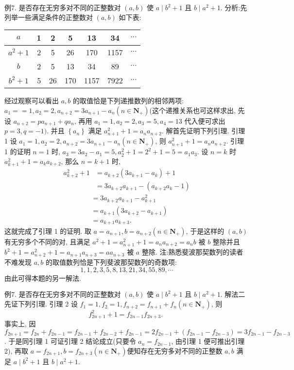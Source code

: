 例7. 是否存在无穷多对不同的正整数对 $(a, b)$ 使 $a \mid b^2+1$ 且 $b \mid a^2+1$.
分析:先列举一些满足条件的正整数对 $(a, b)$ 如下表:
\begin{tabular}{|c|c|c|c|c|c|c|}
\hline$a$ & 1 & 2 & 5 & 13 & 34 & $\cdots$ \\
\hline$a^2+1$ & 2 & 5 & 26 & 170 & 1157 & $\cdots$ \\
\hline$b$ & 2 & 5 & 13 & 34 & 89 & $\cdots$ \\
\hline$b^2+1$ & 5 & 26 & 170 & 1157 & 7922 & $\cdots$ \\
\hline
\end{tabular}
经过观察可以看出 $a, b$ 的取值恰是下列递推数列的相邻两项: $a_1==1, a_2= 2, a_{n+2}=3 a_{n+1}-a_n\left(n \in \mathbf{N}_{+}\right)$(这个递推关系也可这样求出, 先设 $a_{n+2}= p a_{n+1}+q a_n$, 再用 $a_1=1, a_2=2, a_3=5, a_4=13$ 代入便可求出 $p=3, q= -1)$. 并且 $\left\{a_n\right\}$ 满足 $a_{n+1}^2+1=a_n a_{n+2}$.
解首先证明下列引理.
引理 1 设 $a_1=1, a_2=2, a_{n+2}=3 a_{n+1}-a_n\left(n \in \mathbf{N}_{+}\right)$, 则 $a_{n+1}^2+1=a_n a_{n+2}$.
引理 1 的证明 $n=1$ 时, $a_3=3 a_2-a_1=5, a_2^2+1=2^2+1=5=a_1 a_3$.
设 $n=k$ 时 $a_{k+1}^2+1=a_k a_{k+2}$, 那么 $n=k+1$ 时,
$$
\begin{aligned}
a_{k+2}^2+1 & =a_{k+2}\left(3 a_{k+1}-a_k\right)+1 \\
& =3 a_{k+2} a_{k+1}-\left(a_{k+2} a_k-1\right)
\end{aligned}
$$
$$
\begin{aligned}
& =3 a_{k+2} a_{k+1}-a_{k+1}^2 \\
& =a_{k+1}\left(3 a_{k+2}-a_{k+1}\right) \\
& =a_{k+1} a_{k+3} .
\end{aligned}
$$
这就完成了引理 1 的证明.
取 $a=a_{n+1}, b=a_{n+2}\left(n \in \mathbf{N}_{+}\right)$, 于是这样的 $(a, b)$ 有无穷多个不同的对, 且满足 $a^2+1=a_{n+1}^2+1=a_n a_{n+2}=a_n b$ 被 $b$ 整除并且 $b^2+1=a_{n+2}^2+1= a_{n+1} a_{n+3}=a a_{n+3}$ 被 $a$ 整除.
注:熟悉斐波那契数列的读者不难发现 $a, b$ 的取值数列恰是下列斐波那契数列的奇数项:
$$
1,1,2,3,5,8,13,21,34,55,89, \cdots
$$
由此可得本题的另一解法.



例7. 是否存在无穷多对不同的正整数对 $(a, b)$ 使 $a \mid b^2+1$ 且 $b \mid a^2+1$.
解法二先证下列引理.
引理 2 设 $f_1=1, f_2=1, f_{n+2}=f_{n+1}+f_n\left(n \in \mathbf{N}_{+}\right)$, 则
$$
f_{2 n+1}^2+1=f_{2 n-1} f_{2 n+3} \text {. }
$$
事实上, 因 $f_{2 n+1}=f_{2 n}+f_{2 n-1}=f_{2 n-1}+f_{2 n-2}+f_{2 n-1}=2 f_{2 n-1}+\left(f_{2 n-1}-\right. \left.f_{2 n-3}\right)=3 f_{2 n-1}-f_{2 n-3}$. 于是同引理 1 可证引理 2 结论成立(只要令 $a_n= f_{2 n-1}$, 由引理 1 便可推出引理 2), 再取 $a=f_{2 n+1}, b=f_{2 n+3}\left(n \in \mathbf{N}_{+}\right)$便知存在无穷多对不同的正整数 $a, b$ 满足 $a \mid b^2+1$ 且 $b \mid a^2+1$.



